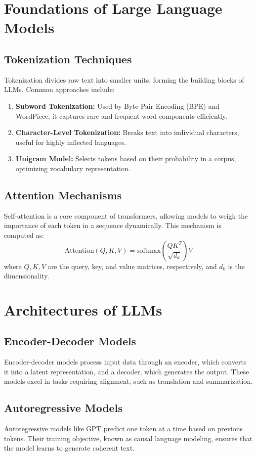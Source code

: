 \documentclass[12pt]{article}
\begin{document}
\section{Foundations of Large Language Models}
\subsection{Tokenization Techniques}
Tokenization divides raw text into smaller units, forming the building blocks of LLMs. Common approaches include:
\begin{enumerate}
    \item \textbf{Subword Tokenization:} Used by Byte Pair Encoding (BPE) and WordPiece, it captures rare and frequent word components efficiently.
    \item \textbf{Character-Level Tokenization:} Breaks text into individual characters, useful for highly inflected languages.
    \item \textbf{Unigram Model:} Selects tokens based on their probability in a corpus, optimizing vocabulary representation.
\end{enumerate}

\subsection{Attention Mechanisms}
Self-attention is a core component of transformers, allowing models to weigh the importance of each token in a sequence dynamically. This mechanism is computed as:
\[
\text{Attention}(Q, K, V) = \text{softmax}\left(\frac{QK^T}{\sqrt{d_k}}\right)V
\]
where \( Q, K, V \) are the query, key, and value matrices, respectively, and \( d_k \) is the dimensionality.

\section{Architectures of LLMs}
\subsection{Encoder-Decoder Models}
Encoder-decoder models process input data through an encoder, which converts it into a latent representation, and a decoder, which generates the output. These models excel in tasks requiring alignment, such as translation and summarization.

\subsection{Autoregressive Models}
Autoregressive models like GPT predict one token at a time based on previous tokens. Their training objective, known as causal language modeling, ensures that the model learns to generate coherent text.
\end{document}
